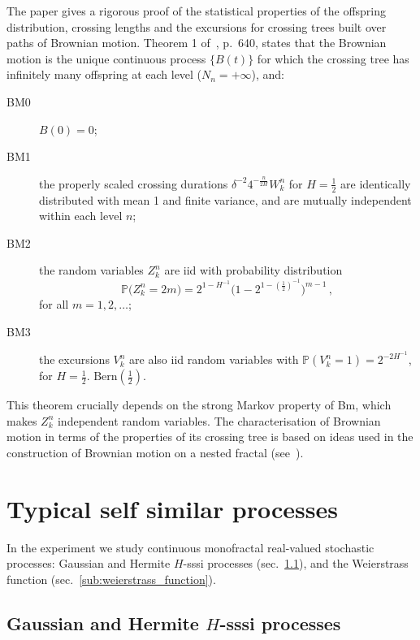 \documentclass[a4paper]{article}
\newcommand{\pr}{\mathbb{P}}
\begin{document}
The paper \cite{ECP1673} gives a rigorous proof of the statistical properties of
the offspring distribution, crossing lengths and the excursions for crossing trees
built over paths of Brownian motion. Theorem 1 of~\cite{ECP1673}, p.~640, states
that the Brownian motion is the unique continuous process $\{B(t)\}$ for which the
crossing tree has infinitely many offspring at each level ($N_n = +\infty$), and:
\begin{description}
    \item[BM0] $B(0) = 0$;
    \item[BM1] the properly scaled crossing durations $\delta^{-2} 4^{-\frac{n}{2H}} W_k^n$
    for $H = \tfrac{1}{2}$ are identically distributed with mean 1 and finite variance,
    and are mutually independent within each level $n$;
    \item[BM2] the random variables $Z_k^n$ are iid with probability distribution
    \[ \pr\bigl(Z_k^n=2m\bigr) = 2^{1-H^{-1}}\bigl(1-2^{1-(\frac{1}{2})^{-1}}\bigr)^{m-1} \,,\]
    for all $m=1,2,\ldots$;
    \item[BM3] the excursions $V_k^n$ are also iid random variables with 
    $\pr( V_k^n = 1 ) = 2^{-2H^{-1}}$, for $H = \tfrac{1}{2}$.
    $\text{Bern}(\tfrac{1}{2})$.
\end{description}
This theorem crucially depends on the strong Markov property of Bm, which makes $Z_k^n$
independent random variables. The characterisation of Brownian motion in terms of
the properties of its crossing tree is based on ideas used in the construction of
Brownian motion on a nested fractal (see~\cite{BarlowPerkins88}).



\section{Typical self similar processes} %
\label{sec:self_sim_processes}

In the experiment we study continuous monofractal real-valued stochastic processes:
Gaussian and Hermite $H$-sssi processes (sec.~\ref{sub:h_sssi_proc}), and the Weierstrass
function (sec.~\ref{sub:weierstrass_function}).

\subsection{Gaussian and Hermite $H$-sssi processes} %
\label{sub:h_sssi_proc}
\end{document}
